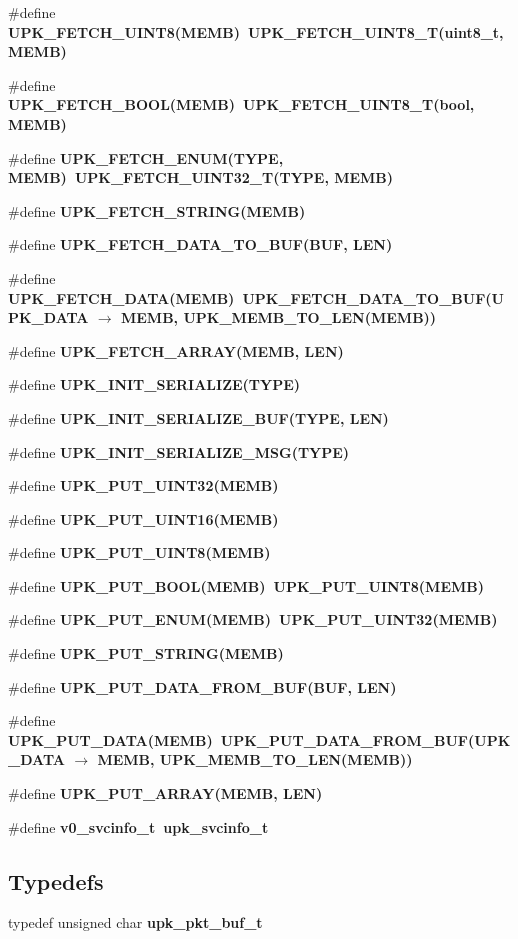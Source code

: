 \begin{CompactItemize}
\#define \bf{UPK\_\-FETCH\_\-UINT8}(MEMB)~UPK\_\-FETCH\_\-UINT8\_\-T(uint8\_\-t, MEMB)
\item 
\#define \bf{UPK\_\-FETCH\_\-BOOL}(MEMB)~UPK\_\-FETCH\_\-UINT8\_\-T(bool, MEMB)
\item 
\#define \bf{UPK\_\-FETCH\_\-ENUM}(TYPE, MEMB)~UPK\_\-FETCH\_\-UINT32\_\-T(TYPE, MEMB)
\item 
\#define \bf{UPK\_\-FETCH\_\-STRING}(MEMB)
\item 
\#define \bf{UPK\_\-FETCH\_\-DATA\_\-TO\_\-BUF}(BUF, LEN)
\item 
\#define \bf{UPK\_\-FETCH\_\-DATA}(MEMB)~UPK\_\-FETCH\_\-DATA\_\-TO\_\-BUF(UPK\_\-DATA $\rightarrow$ MEMB, UPK\_\-MEMB\_\-TO\_\-LEN(MEMB))
\item 
\#define \bf{UPK\_\-FETCH\_\-ARRAY}(MEMB, LEN)
\item 
\#define \bf{UPK\_\-INIT\_\-SERIALIZE}(TYPE)
\item 
\#define \bf{UPK\_\-INIT\_\-SERIALIZE\_\-BUF}(TYPE, LEN)
\item 
\#define \bf{UPK\_\-INIT\_\-SERIALIZE\_\-MSG}(TYPE)
\item 
\#define \bf{UPK\_\-PUT\_\-UINT32}(MEMB)
\item 
\#define \bf{UPK\_\-PUT\_\-UINT16}(MEMB)
\item 
\#define \bf{UPK\_\-PUT\_\-UINT8}(MEMB)
\item 
\#define \bf{UPK\_\-PUT\_\-BOOL}(MEMB)~UPK\_\-PUT\_\-UINT8(MEMB)
\item 
\#define \bf{UPK\_\-PUT\_\-ENUM}(MEMB)~UPK\_\-PUT\_\-UINT32(MEMB)
\item 
\#define \bf{UPK\_\-PUT\_\-STRING}(MEMB)
\item 
\#define \bf{UPK\_\-PUT\_\-DATA\_\-FROM\_\-BUF}(BUF, LEN)
\item 
\#define \bf{UPK\_\-PUT\_\-DATA}(MEMB)~UPK\_\-PUT\_\-DATA\_\-FROM\_\-BUF(UPK\_\-DATA $\rightarrow$ MEMB, UPK\_\-MEMB\_\-TO\_\-LEN(MEMB))
\item 
\#define \bf{UPK\_\-PUT\_\-ARRAY}(MEMB, LEN)
\item 
\#define \bf{v0\_\-svcinfo\_\-t}~\bf{upk\_\-svcinfo\_\-t}
\end{CompactItemize}
\subsection*{Typedefs}
\begin{CompactItemize}
\item 
typedef unsigned char \bf{upk\_\-pkt\_\-buf\_\-t}
\end{CompactItemize}
